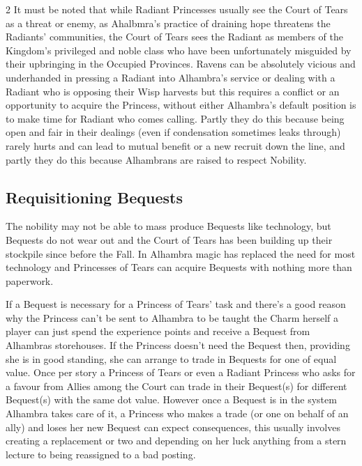\begin{multicols}{2}
It must be noted that while Radiant Princesses usually see the Court of Tears as a threat or enemy, as Ahalbmra's practice of draining hope threatens the Radiants' communities, the Court of Tears sees the Radiant as members of the Kingdom's privileged and noble class who have been unfortunately misguided by their upbringing in the Occupied Provinces. Ravens can be absolutely vicious and underhanded in pressing a Radiant into Alhambra's service or dealing with a Radiant who is opposing their Wisp harvests but this requires a conflict or an opportunity to acquire the Princess, without either Alhambra's default position is to make time for Radiant who comes calling. Partly they do this because being open and fair in their dealings (even if condensation sometimes leaks through) rarely hurts and can lead to mutual benefit or a new recruit down the line, and partly they do this because Alhambrans are raised to respect Nobility. 


\begin{mybox}


\subsection*{Requisitioning Bequests}

The nobility may not be able to mass produce Bequests like technology, but Bequests do not wear out and the Court of Tears has been building up their stockpile since before the Fall. In Alhambra magic has replaced the need for most technology and Princesses of Tears can acquire Bequests with nothing more than paperwork. 

If a Bequest is necessary for a Princess of Tears' task and there's a good reason why the Princess can't be sent to Alhambra to be taught the Charm herself a player can just spend the experience points and receive a Bequest from Alhambras storehouses. If the Princess doesn't need the Bequest then, providing she is in good standing, she can arrange to trade in Bequests for one of equal value. Once per story a Princess of Tears or even a Radiant Princess who asks for a favour from Allies among the Court can trade in their Bequest(s) for different Bequest(s) with the same dot value. However once a Bequest is in the system Alhambra takes care of it, a Princess who makes a trade (or one on behalf of an ally) and loses her new Bequest can expect consequences, this usually involves creating a replacement or two and depending on her luck anything from a stern lecture to being reassigned to a bad posting. 


\end{mybox}
\end{multicols}
